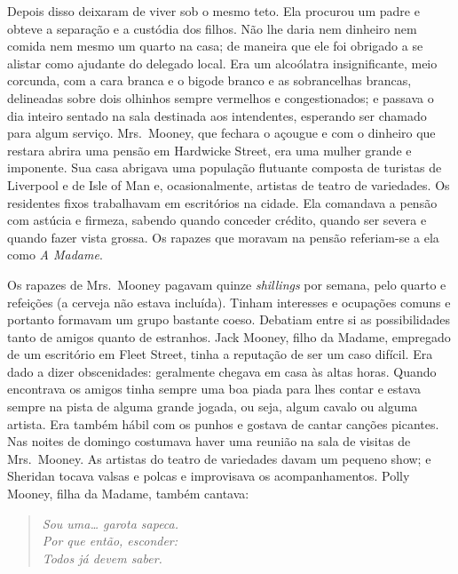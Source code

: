 Depois disso deixaram de viver sob o mesmo teto.  Ela procurou um padre e
obteve a separação e a custódia dos filhos.  Não lhe daria nem dinheiro nem
comida nem mesmo um quarto na casa; de maneira que ele foi obrigado a se
alistar como ajudante do delegado local.  Era um alcoólatra insignificante,
meio corcunda, com a cara branca e o bigode branco e as sobrancelhas brancas,
delineadas sobre dois olhinhos sempre vermelhos e congestionados; e passava o
dia inteiro sentado na sala destinada aos intendentes, esperando ser chamado
para algum serviço.  Mrs.~Mooney, que fechara o açougue e com o dinheiro que
restara abrira uma pensão em Hardwicke Street, era uma mulher grande e
imponente.  Sua casa abrigava uma população flutuante composta de turistas de
Liverpool e de Isle of Man e, ocasionalmente, artistas de teatro de variedades.
Os residentes fixos trabalhavam em escritórios na cidade.  Ela comandava a
pensão com astúcia e firmeza, sabendo quando conceder crédito, quando ser
severa e quando fazer vista grossa.  Os rapazes que moravam na pensão
referiam-se a ela como \textit{A Madame}.

Os rapazes de Mrs.~Mooney pagavam quinze \textit{shillings} por semana, pelo
quarto e refeições (a cerveja não estava incluída).  Tinham interesses e
ocupações comuns e portanto formavam um grupo bastante coeso.  Debatiam entre
si as possibilidades tanto de amigos quanto de estranhos.  Jack Mooney, filho
da Madame, empregado de um escritório em Fleet Street, tinha a reputação de ser
um caso difícil.  Era dado a dizer obscenidades: geralmente chegava em casa às
altas horas.  Quando encontrava os amigos tinha sempre uma boa piada para lhes
contar e estava sempre na pista de alguma grande jogada, ou seja, algum cavalo
ou alguma artista.  Era também hábil com os punhos e gostava de cantar canções
picantes.  Nas noites de domingo costumava haver uma reunião na sala de visitas
de Mrs.~Mooney.  As artistas do teatro de variedades davam um pequeno show; e
Sheridan tocava valsas e polcas e improvisava os acompanhamentos.  Polly
Mooney, filha da Madame, também cantava:

\begin{verse}\itshape
Sou uma\ldots{} garota sapeca.\\
Por que então, esconder:\\
Todos já devem saber.
\end{verse}

